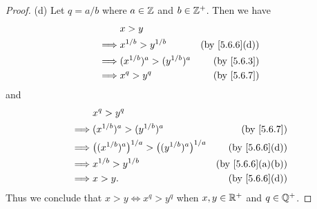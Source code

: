 \begin{proof}{(d)}
  Let \(q = a / b\) where \(a \in \mathbb{Z}\) and \(b \in \mathbb{Z}^+\).
  Then we have
  \begin{align*}
             & x > y                                                       \\
    \implies & x^{1 / b} > y^{1 / b}         & \text{(by \cref{5.6.6}(d))} \\
    \implies & (x^{1 / b})^a > (y^{1 / b})^a & \text{(by \cref{5.6.3})}    \\
    \implies & x^q > y^q                     & \text{(by \cref{5.6.7})}
  \end{align*}
  and
  \begin{align*}
             & x^q > y^q                                                                                          \\
    \implies & (x^{1 / b})^a > (y^{1 / b})^a                                     & \text{(by \cref{5.6.7})}       \\
    \implies & \big((x^{1 / b})^a\big)^{1 / a} > \big((y^{1 / b})^a\big)^{1 / a} & \text{(by \cref{5.6.6}(d))}    \\
    \implies & x^{1 / b} > y^{1 / b}                                             & \text{(by \cref{5.6.6}(a)(b))} \\
    \implies & x > y.                                                            & \text{(by \cref{5.6.6}(d))}
  \end{align*}
  Thus we conclude that \(x > y \iff x^q > y^q\) when \(x, y \in \mathbb{R}^+\) and \(q \in \mathbb{Q}^+\).
\end{proof}

